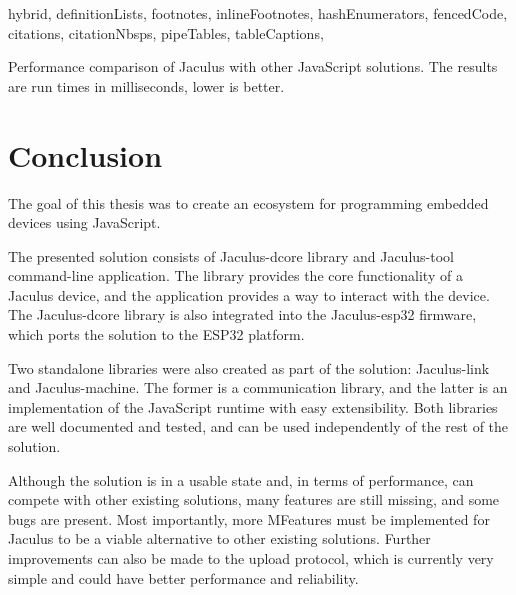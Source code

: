 \begin{markdown*}{%
  hybrid,
  definitionLists,
  footnotes,
  inlineFootnotes,
  hashEnumerators,
  fencedCode,
  citations,
  citationNbsps,
  pipeTables,
  tableCaptions,
}
\begin{table}[ht]
  \caption[Performance comparison of Jaculus with other JavaScript solutions]{Performance comparison of Jaculus with other JavaScript solutions. The results are run times in milliseconds, lower is better.}

  \label{tab:performance}
\end{table}


\chapter{Conclusion}

The goal of this thesis was to create an ecosystem for programming embedded devices using JavaScript.

The presented solution consists of Jaculus-dcore library and Jaculus-tool command-line application. The library provides the core functionality of a Jaculus device, and the application provides a way to interact with the device. The Jaculus-dcore library is also integrated into the Jaculus-esp32 firmware, which ports the solution to the ESP32 platform.

Two standalone libraries were also created as part of the solution: Jaculus-link and Jaculus-machine. The former is a communication library, and the latter is an implementation of the JavaScript runtime with easy extensibility. Both libraries are well documented and tested, and can be used independently of the rest of the solution.

Although the solution is in a usable state and, in terms of performance, can compete with other existing solutions, many features are still missing, and some bugs are present. Most importantly, more MFeatures must be implemented for Jaculus to be a viable alternative to other existing solutions. Further improvements can also be made to the upload protocol, which is currently very simple and could have better performance and reliability.

\end{markdown*}
